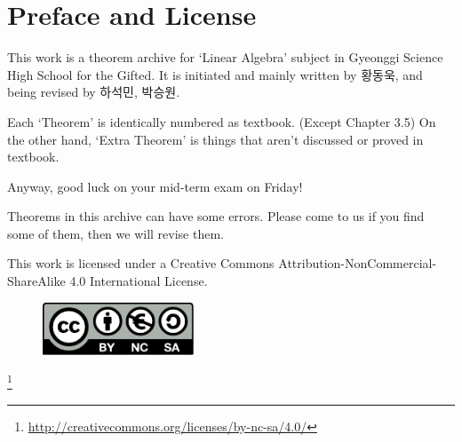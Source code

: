 \chapter*{Preface and License}
This work is a theorem archive for `Linear Algebra' subject in Gyeonggi Science High School for the Gifted. It is initiated and mainly written by 황동욱, and being revised by 하석민, 박승원.

Each `Theorem' is identically numbered as textbook. (Except Chapter 3.5) On the other hand, `Extra Theorem' is things that aren't discussed or proved in textbook.

Anyway, good luck on your mid-term exam on Friday!

Theorems in this archive can have some errors. Please come to us if you find some of them, then we will revise them.

This work is licensed under a Creative Commons Attribution-NonCommercial-ShareAlike 4.0 International License.
\begin{figure}[h]
	\centering
	\includegraphics[width=0.4\textwidth]{by-nc-sa.pdf}
\end{figure} \footnote{\url{http://creativecommons.org/licenses/by-nc-sa/4.0/}}